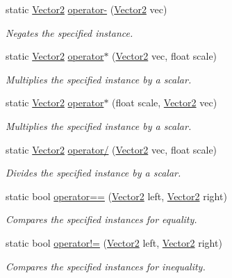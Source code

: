\begin{DoxyCompactItemize}
static \hyperlink{struct_open_t_k_1_1_vector2}{Vector2} \hyperlink{struct_open_t_k_1_1_vector2_ab03680c8f164c965567805d976f6cf9b}{operator-\/} (\hyperlink{struct_open_t_k_1_1_vector2}{Vector2} vec)
\begin{DoxyCompactList}\small\item\em Negates the specified instance. \end{DoxyCompactList}\item 
static \hyperlink{struct_open_t_k_1_1_vector2}{Vector2} \hyperlink{struct_open_t_k_1_1_vector2_a706d5f6f8d648bda3616b83afd96eefd}{operator$\ast$} (\hyperlink{struct_open_t_k_1_1_vector2}{Vector2} vec, float scale)
\begin{DoxyCompactList}\small\item\em Multiplies the specified instance by a scalar. \end{DoxyCompactList}\item 
static \hyperlink{struct_open_t_k_1_1_vector2}{Vector2} \hyperlink{struct_open_t_k_1_1_vector2_a2563c5cedf5a4847a9635354304814fd}{operator$\ast$} (float scale, \hyperlink{struct_open_t_k_1_1_vector2}{Vector2} vec)
\begin{DoxyCompactList}\small\item\em Multiplies the specified instance by a scalar. \end{DoxyCompactList}\item 
static \hyperlink{struct_open_t_k_1_1_vector2}{Vector2} \hyperlink{struct_open_t_k_1_1_vector2_a98e478e91ed66a141651d6cca49ca8be}{operator/} (\hyperlink{struct_open_t_k_1_1_vector2}{Vector2} vec, float scale)
\begin{DoxyCompactList}\small\item\em Divides the specified instance by a scalar. \end{DoxyCompactList}\item 
static bool \hyperlink{struct_open_t_k_1_1_vector2_a0ea969b3acedb9d94878db6f14fb3679}{operator==} (\hyperlink{struct_open_t_k_1_1_vector2}{Vector2} left, \hyperlink{struct_open_t_k_1_1_vector2}{Vector2} right)
\begin{DoxyCompactList}\small\item\em Compares the specified instances for equality. \end{DoxyCompactList}\item 
static bool \hyperlink{struct_open_t_k_1_1_vector2_a9535e4308a8b0708b6ecc3452e3336fe}{operator!=} (\hyperlink{struct_open_t_k_1_1_vector2}{Vector2} left, \hyperlink{struct_open_t_k_1_1_vector2}{Vector2} right)
\begin{DoxyCompactList}\small\item\em Compares the specified instances for inequality. \end{DoxyCompactList}\end{DoxyCompactItemize}
